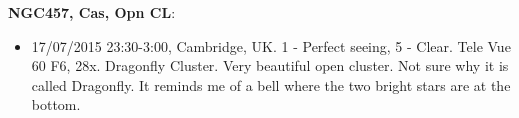{\bf NGC457, Cas, Opn CL}:
\begin{itemize}
\item 17/07/2015 23:30-3:00, Cambridge, UK. 1 - Perfect seeing, 5 - Clear. Tele Vue 60 F6, 28x. Dragonfly Cluster. Very beautiful open cluster. Not sure why it is called Dragonfly. It reminds me of a bell where the two bright stars are at the bottom.
\end{itemize}
